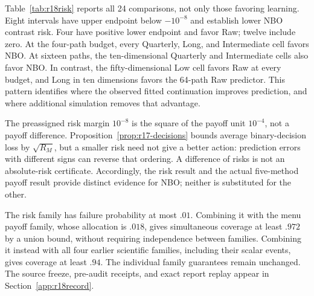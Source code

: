 

Table~\ref{tab:r18risk} reports all 24 comparisons, not only those favoring
learning. Eight intervals have upper endpoint below $-10^{-8}$ and establish
lower NBO contrast risk. Four have positive lower endpoint and favor Raw;
twelve include zero. At the four-path budget, every Quarterly, Long, and
Intermediate cell favors NBO. At sixteen paths, the ten-dimensional
Quarterly and Intermediate cells also favor NBO. In contrast, the
fifty-dimensional Low cell favors Raw at every budget, and Long in ten
dimensions favors the 64-path Raw predictor. This pattern identifies where
the observed fitted continuation improves prediction, and where additional
simulation removes that advantage.

The preassigned risk margin $10^{-8}$ is the square of the payoff unit
$10^{-4}$, not a payoff difference. Proposition~\ref{prop:r17-decisions}
bounds average binary-decision loss by $\sqrt{R_M}$, but a smaller risk
need not give a better action: prediction errors with different signs can
reverse that ordering. A difference of risks is not an absolute-risk
certificate. Accordingly, the risk result and the actual five-method payoff
result provide distinct evidence for NBO; neither is substituted for the
other.

The risk family has failure probability at most $.01$. Combining it with
the menu payoff family, whose allocation is $.018$, gives simultaneous
coverage at least $.972$ by a union bound, without requiring independence
between families. Combining it instead with all four earlier scientific
families, including their scalar events, gives coverage at least $.94$.
The individual family guarantees remain unchanged. The source freeze,
pre-audit receipts, and exact report replay appear in
Section~\ref{app:r18record}.
